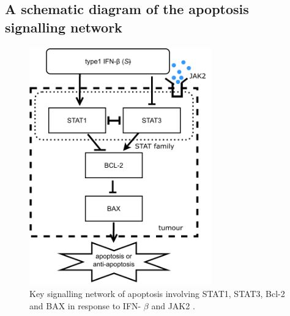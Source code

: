 \subsection{A schematic diagram of the apoptosis signalling network }
\paragraph{}

 \begin{figure}[hbt!]
	\centering
	\begin{framed}
	\includegraphics[width=0.7\textwidth]{Figures/D1.pdf}
		\end{framed}
	\caption{Key signalling network of apoptosis involving
STAT1, STAT3, Bcl-2 and BAX in response to IFN- $\beta$ and  JAK2  \cite{lee2021mathematical}.}
	\label{D1}
\end{figure}

